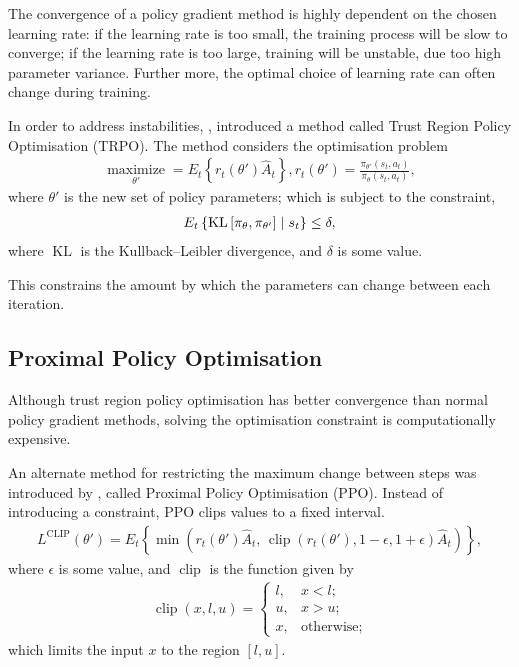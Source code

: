 The convergence of a policy gradient method is highly dependent on the chosen
learning rate:
if the learning rate is too small, the training process will be slow to
converge;
if the learning rate is too large, training will be unstable, due too high
parameter variance.
Further more, the optimal choice of learning rate can often change during
training.

In order to address instabilities, \cite{Schulman:2015:Trust}, introduced a
method called Trust Region Policy Optimisation (TRPO).
The method considers the optimisation problem
\begin{align*}
    \underset{\theta'}{\operatorname{maximize}} = E_t\left\{
        r_t(\theta')\hat{A}_t
    \right\},
    r_t(\theta') = \frac{\pi_{\theta'}(s_t,a_t)}{\pi_{\theta}(s_t,a_t)},
\end{align*}
where $\theta'$ is the new set of policy parameters; which is subject to the
constraint,
\begin{align*}
    E_t\left\{ \operatorname{KL}\left[\pi_{\theta},\pi_{\theta'}\right]
        \;\middle|\; s_t
    \right\} \leq \delta,
\end{align*}
where $\operatorname{KL}$ is the Kullback–Leibler divergence, and $\delta$ is
some value.

This constrains the amount by which the parameters can change between each
iteration.



\subsection{Proximal Policy Optimisation}

Although trust region policy optimisation has better convergence than normal
policy gradient methods, solving the optimisation constraint is computationally
expensive.

An alternate method for restricting the maximum change between steps was
introduced by \cite{Schulman:2017:Proximal}, called Proximal Policy
Optimisation (PPO).
Instead of introducing a constraint, PPO clips values to a fixed interval.
\begin{align*}
    L^\text{CLIP}(\theta') = E_t\left\{ \min\left(
        r_t(\theta')\hat{A}_t,\,
        \operatorname{clip} (r_t(\theta'), 1 - \epsilon, 1 + \epsilon)\hat{A}_t
    \right) \right\},
\end{align*}
where $\epsilon$ is some value, and $\operatorname{clip}$ is the function given
by
\begin{align*}
    \operatorname{clip}(x,l,u) = \begin{cases}
        l, & x < l;\\
        u, & x > u;\\
        x, & \text{otherwise};
    \end{cases}
\end{align*}
which limits the input $x$ to the region $[l,u]$.



